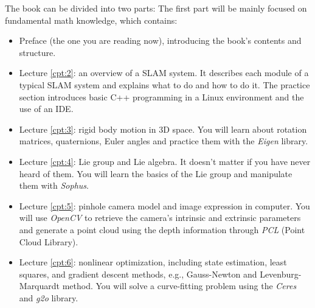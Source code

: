 \begin{English}
    The book can be divided into two parts: The first part will be mainly focused on fundamental math knowledge, which contains:
    \begin{itemize}
    	\item Preface (the one you are reading now), introducing the book's contents and structure.
    	\item Lecture \ref{cpt:2}: an overview of a SLAM system. It describes each module of a typical SLAM system and explains what to do and how to do it. The practice section introduces basic C++ programming in a Linux environment and the use of an IDE.
    	\item Lecture \ref{cpt:3}: rigid body motion in 3D space. You will learn about rotation matrices, quaternions, Euler angles and practice them with the \textit{Eigen} library.
    	\item Lecture \ref{cpt:4}: Lie group and Lie algebra. It doesn't matter if you have never heard of them. You will learn the basics of the Lie group and manipulate them with \textit{Sophus}.
    	\item Lecture \ref{cpt:5}: pinhole camera model and image expression in computer. You will use \textit{OpenCV} to retrieve the camera's intrinsic and extrinsic parameters and generate a point cloud using the depth information through \textit{PCL} (Point Cloud Library).
    	\item Lecture \ref{cpt:6}: nonlinear optimization, including state estimation, least squares, and gradient descent methods, e.g., Gauss-Newton and Levenburg-Marquardt method. You will solve a curve-fitting problem using the \textit{Ceres} and \textit{g2o} library.
    \end{itemize}
\end{English}


